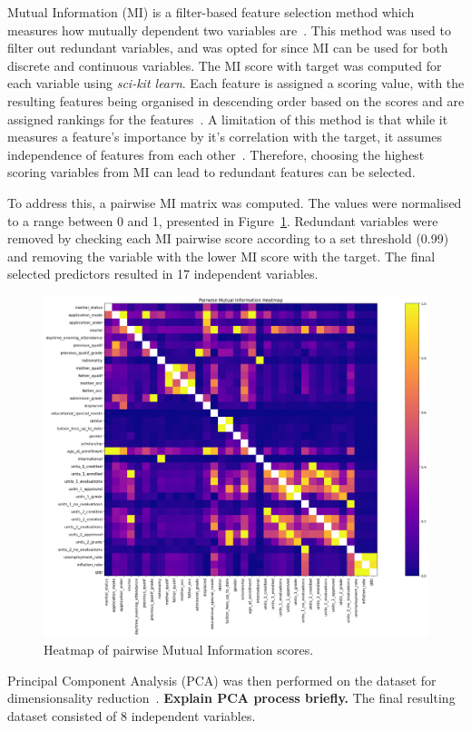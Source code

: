 \documentclass[12pt]{article}
\begin{document}
Mutual Information (MI) is a filter-based feature selection method which measures how mutually dependent two variables are~\cite{VenkateshAnuradha2019}. This method was used to filter out redundant variables, and was opted for since MI can be used for both discrete and continuous variables. The MI score with target was computed for each variable using \textit{sci-kit learn}. Each feature is assigned a scoring value, with the resulting features being organised in descending order based on the scores and are assigned rankings for the features~\cite{VenkateshAnuradha2019}. A limitation of this method is that while it measures a feature's importance by it's correlation with the target, it assumes independence of features from each other~\cite{Li2017}. Therefore, choosing the highest scoring variables from MI can lead to redundant features can be selected.

To address this, a pairwise MI matrix was computed. The values were normalised to a range between 0 and 1, presented in Figure~\ref{fig:pairwise_mi}. Redundant variables were removed by checking each MI pairwise score according to a set threshold (0.99) and removing the variable with the lower MI score with the target. The final selected predictors resulted in 17 independent variables.

\begin{figure} [H]
    \centering
    \includegraphics[width=0.8\linewidth]{pairwise_mi}
    \caption{Heatmap of pairwise Mutual Information scores.}\label{fig:pairwise_mi}
  \end{figure}  

Principal Component Analysis (PCA) was then performed on the dataset for dimensionsality reduction~\cite{Gewers2021}. \textbf{Explain PCA process briefly.} The final resulting dataset consisted of 8 independent variables.
\end{document}
